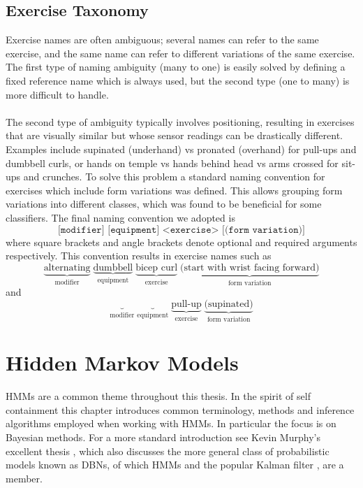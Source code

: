 \documentclass[12pt]{report}
\newcommand{\m}[1]{\texttt{#1}}
\newcommand{\1}[0]{\mathbbm{1}}
\begin{document}
\section{Exercise Taxonomy}
\label{sec:Exercise Taxonomy}
Exercise names are often ambiguous; several names can refer to the same exercise,
and the same name can refer to different variations of the same exercise.
The first type of naming ambiguity (many to one) is easily solved by defining a fixed reference name
which is always used, but the second type (one to many) is more difficult to handle.
\\\\
The second type of ambiguity typically involves positioning, resulting in exercises that are visually similar
but whose sensor readings can be drastically different.
Examples include supinated (underhand) vs pronated (overhand) for pull-ups and dumbbell curls,
or hands on temple vs hands behind head vs arms crossed for sit-ups and crunches. To solve this problem
a standard naming convention for exercises which include form variations was defined. This allows grouping
form variations into different classes, which was found to be beneficial for some classifiers.
The final naming convention we adopted is
\[
    \m{[modifier] [equipment] <exercise> [(form variation)]}
\]
where square brackets and angle brackets denote optional and required arguments respectively.
This convention results in exercise names such as
\[
    \underbrace{\text{alternating}}_{\text{modifier}} \; \underbrace{\text{dumbbell}}_{\text{equipment}} \; \underbrace{\text{bicep curl}}_{\text{exercise}} \; \underbrace{\text{(start with wrist facing forward)}}_{\text{form variation}}
\]
and
\[
    \underbrace{}_{\text{modifier}} \; \underbrace{}_{\text{equipment}} \; \underbrace{\text{pull-up}}_{\text{exercise}} \; \underbrace{\text{(supinated)}}_{\text{form variation}}
\]

\chapter{Hidden Markov Models}
\label{chap: Hidden Markov Models}
\acp{HMM} \cite{rabiner-hmms} are a common theme throughout this thesis.
In the spirit of self containment this chapter introduces common terminology,
methods and inference algorithms employed when working with \acp{HMM}. In particular
the focus is on Bayesian methods. For a more standard introduction see Kevin Murphy's excellent thesis
\cite{murphy-thesis}, which also discusses the more general class of probabilistic models
known as \acp{DBN}, of which \acp{HMM} and the popular Kalman filter \cite{kalman-filter}, are a member.
\end{document}
